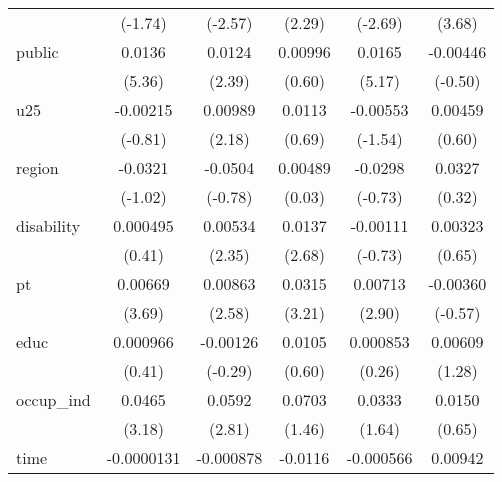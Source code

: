 {\begin{longtable}{l*{5}{c}}
            &     (-1.74)         &     (-2.57)         &      (2.29)         &     (-2.69)         &      (3.68)         \\
public      &      0.0136\sym{***}&      0.0124\sym{*}  &     0.00996         &      0.0165\sym{***}&    -0.00446         \\
            &      (5.36)         &      (2.39)         &      (0.60)         &      (5.17)         &     (-0.50)         \\
u25         &    -0.00215         &     0.00989\sym{*}  &      0.0113         &    -0.00553         &     0.00459         \\
            &     (-0.81)         &      (2.18)         &      (0.69)         &     (-1.54)         &      (0.60)         \\
region      &     -0.0321         &     -0.0504         &     0.00489         &     -0.0298         &      0.0327         \\
            &     (-1.02)         &     (-0.78)         &      (0.03)         &     (-0.73)         &      (0.32)         \\
disability  &    0.000495         &     0.00534\sym{*}  &      0.0137\sym{**} &    -0.00111         &     0.00323         \\
            &      (0.41)         &      (2.35)         &      (2.68)         &     (-0.73)         &      (0.65)         \\
pt          &     0.00669\sym{***}&     0.00863\sym{**} &      0.0315\sym{**} &     0.00713\sym{**} &    -0.00360         \\
            &      (3.69)         &      (2.58)         &      (3.21)         &      (2.90)         &     (-0.57)         \\
educ        &    0.000966         &    -0.00126         &      0.0105         &    0.000853         &     0.00609         \\
            &      (0.41)         &     (-0.29)         &      (0.60)         &      (0.26)         &      (1.28)         \\
occup\_ind   &      0.0465\sym{**} &      0.0592\sym{**} &      0.0703         &      0.0333         &      0.0150         \\
            &      (3.18)         &      (2.81)         &      (1.46)         &      (1.64)         &      (0.65)         \\
time        &  -0.0000131         &   -0.000878         &     -0.0116         &   -0.000566         &     0.00942         \\

\end{longtable}}
